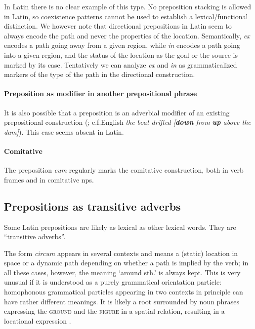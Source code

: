 \documentclass[a4paper, oneside, 12pt]{report}
\newcommand{\form}[1]{\emph{#1}}
\newcommand*{\category}[1]{\textsc{#1}}
\newcommand{\translate}[1]{`#1'}
\begin{document}
In Latin there is no clear example of this type.
No preposition stacking is allowed in Latin,
so coexistence patterns cannot be used to establish a lexical/functional distinction.
We however note that directional prepositions in Latin
seem to always encode the path
and never the properties of the location.
Semantically, \form{ex} encodes a path going away from a given region, 
while \form{in} encodes a path going into a given region,
and the status of the location as the goal or the source
is marked by its case.
Tentatively we can analyze \form{ex} and \form{in}
as grammaticalized markers of the type of the path in the directional construction.

\paragraph*{Preposition as modifier in another prepositional phrase}
It is also possible that a preposition is an adverbial modifier of an existing prepositional construction
(\citealt{botwinik2008greek};
c.f.English \form{the boat drifted [\textbf{down} from \textbf{up} above the dam]}).
This case seems absent in Latin.

\paragraph*{Comitative}
The preposition \form{cum} regularly marks the comitative construction,
both in verb frames and in comitative \acp{np}.

\subsection{Prepositions as transitive adverbs}

Some Latin prepositions are likely as lexical as other lexical words.
They are ``transitive adverbs''.

The form \form{circum} appears in several contexts
and means a (static) location in space or a dynamic path 
depending on whether a path is implied by the verb;
in all these cases, however, the meaning \translate{around sth.} is always kept.
This is very unusual if it is understood as a purely grammatical orientation particle:
homophonous grammatical particles appearing in two contexts in principle can have rather different meanings.
It is likely a root surrounded by noun phrases expressing the \category{ground} and the \category{figure} 
in a spatial relation,
resulting in a locational expression \citet{mare2018issues}.
\end{document}

